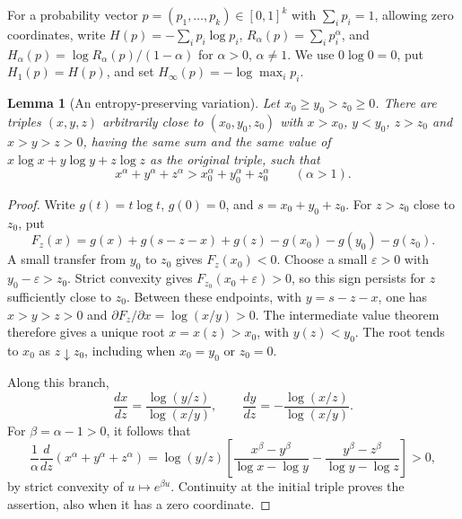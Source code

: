 \documentclass[11pt,a4paper,reqno]{amsart}
\newtheorem{lemma}[theorem]{Lemma}
\theoremstyle{remark}
\numberwithin{equation}{section}
\begin{document}
For a probability vector $p=(p_1,\ldots,p_k)\in[0,1]^k$ with
$\sum_i p_i=1$, allowing zero coordinates, write
$H(p)=-\sum_i p_i\log p_i$, $R_\alpha(p)=\sum_i p_i^\alpha$,
and $H_\alpha(p)=\log R_\alpha(p)/(1-\alpha)$ for
$\alpha>0$, $\alpha\ne1$. We use $0\log0=0$, put
$H_1(p)=H(p)$, and set $H_\infty(p)=-\log\max_i p_i$.

\begin{lemma}[An entropy-preserving variation]
\label{lem:entropy-preserving-variation}
Let $x_0\ge y_0>z_0\ge0$. There are triples $(x,y,z)$ arbitrarily close
to $(x_0,y_0,z_0)$ with $x>x_0$, $y<y_0$, $z>z_0$ and $x>y>z>0$,
having the same sum and the same value of
$x\log x+y\log y+z\log z$ as the original triple, such that
\[
 x^\alpha+y^\alpha+z^\alpha
 >x_0^\alpha+y_0^\alpha+z_0^\alpha
 \qquad(\alpha>1).
\]
\end{lemma}
\begin{proof}
Write $g(t)=t\log t$, $g(0)=0$, and $s=x_0+y_0+z_0$. For
$z>z_0$ close to $z_0$, put
\[
 F_z(x)=g(x)+g(s-z-x)+g(z)
        -g(x_0)-g(y_0)-g(z_0).
\]
A small transfer from $y_0$ to $z_0$ gives $F_z(x_0)<0$.
Choose a small $\varepsilon>0$ with $y_0-\varepsilon>z_0$.
Strict convexity gives $F_{z_0}(x_0+\varepsilon)>0$, so this sign
persists for $z$ sufficiently close to $z_0$. Between these endpoints,
with $y=s-z-x$, one has $x>y>z>0$ and
$\partial F_z/\partial x=\log(x/y)>0$. The intermediate value theorem
therefore gives a unique root $x=x(z)>x_0$, with $y(z)<y_0$.
The root tends to $x_0$ as $z\downarrow z_0$, including when
$x_0=y_0$ or $z_0=0$.

Along this branch,
\[
 \frac{dx}{dz}=\frac{\log(y/z)}{\log(x/y)},\qquad
 \frac{dy}{dz}=-\frac{\log(x/z)}{\log(x/y)}.
\]
For $\beta=\alpha-1>0$, it follows that
\[
 \frac1\alpha\frac{d}{dz}(x^\alpha+y^\alpha+z^\alpha)
 =\log(y/z)\left[
 \frac{x^\beta-y^\beta}{\log x-\log y}
 -\frac{y^\beta-z^\beta}{\log y-\log z}\right]>0,
\]
by strict convexity of $u\mapsto e^{\beta u}$. Continuity at the
initial triple proves the assertion, also when it has a zero coordinate.
\end{proof}
\end{document}
